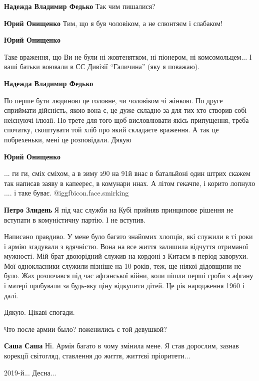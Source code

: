 \begin{itemize}
\begin{itemize}
\begin{itemize}
\textbf{Надежда Владимир Федько} Так чим пишалися?

\textbf{Юрий Онищенко} Тим, що я був чоловіком, а не слюнтяєм і слабаком!

\textbf{Юрий Онищенко} 

Таке враження, що Ви не були ні жовтенятком, ні піонером, ні комсомольцем... І
ваші батьки воювали в СС Дивізії \enquote{Галичина} (яку я поважаю).

\textbf{Надежда Владимир Федько} 

По перше бути людиною це головне, чи чоловіком чі жінкою. По друге сприймати
дійсність, якою вона є, це дуже складно за для тих хто створив собі неіснуючі
ілюзії. По трете для того щоб висловлювати якісь припущення, треба спочатку,
скоштувати той хліб про який складаєте враження. А так це побрехеньки, мені це
розповідали. Дякую

\textbf{Юрий Онищенко} 

... ги ги, сміх сміхом, а в зиму з90 на 91й внас в батальйоні один штрих
скажем так написав заяву в капеерес, в комунари ннах. А літом гекачпе, і
корито лопнуло .... і таке буває. @igg{fbicon.face.smirking} 

\textbf{Петро Злидень} Я під час служби на Кубі прийняв принципове рішення не вступати в комуністичну партію. І не вступив.
\end{itemize} %


Написано правдиво. У мене було багато знайомих хлопців, які служили в ті роки і
армію згадували з вдячністю. Вона на все життя залишила відчуття отриманої
мужності. Мій брат двоюрідний служив на кордоні з Китаєм в період заворухи. Мої
однокласники служили пізніше на 10 років, теж, ще ніякої дідовщини не було. Жах
розпочався під час афганської війни, коли пішли перші гроби з афгану і матері
пробували за будь-яку ціну відкупити дітей. Це рік народження 1960 і далі.

\end{itemize} %

Дякую. Цікаві спогади.

Что после армии было? поженились с той девушкой?

\begin{itemize} %
\textbf{Саша Саша} Ні. Армія багато в чому змінила мене. Я став дорослим, зазнав корекції світогляд, ставлення до життя, життєві пріоритети...
\end{itemize} %


2019-й... Десна...

\end{itemize} %
